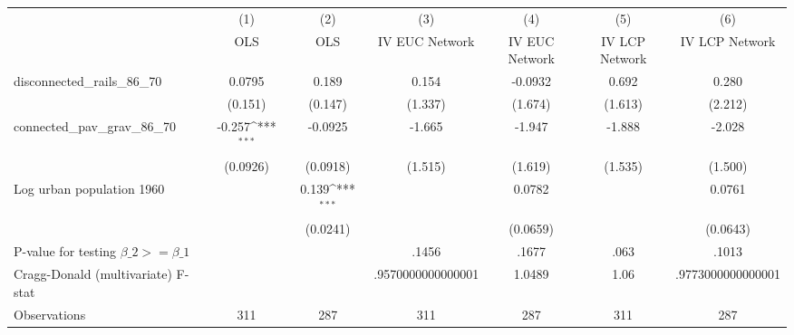 {
\def\sym#1{\ifmmode^{#1}\else\(^{#1}\)\fi}
\begin{tabular}{l*{6}{c}}
\hline\hline
                &\multicolumn{1}{c}{(1)}&\multicolumn{1}{c}{(2)}&\multicolumn{1}{c}{(3)}&\multicolumn{1}{c}{(4)}&\multicolumn{1}{c}{(5)}&\multicolumn{1}{c}{(6)}\\
                &\multicolumn{1}{c}{OLS}&\multicolumn{1}{c}{OLS}&\multicolumn{1}{c}{IV EUC Network}&\multicolumn{1}{c}{IV EUC Network}&\multicolumn{1}{c}{IV LCP Network}&\multicolumn{1}{c}{IV LCP Network}\\
\hline
disconnected\_rails\_86\_70&   0.0795         &    0.189         &    0.154         &  -0.0932         &    0.692         &    0.280         \\
                &  (0.151)         &  (0.147)         &  (1.337)         &  (1.674)         &  (1.613)         &  (2.212)         \\
[1em]
connected\_pav\_grav\_86\_70&   -0.257\sym{***}&  -0.0925         &   -1.665         &   -1.947         &   -1.888         &   -2.028         \\
                & (0.0926)         & (0.0918)         &  (1.515)         &  (1.619)         &  (1.535)         &  (1.500)         \\
[1em]
Log urban population 1960&                  &    0.139\sym{***}&                  &   0.0782         &                  &   0.0761         \\
                &                  & (0.0241)         &                  & (0.0659)         &                  & (0.0643)         \\
\hline
P-value for testing $\beta\_{2} >= \beta\_{1}$&                  &                  &    .1456         &    .1677         &     .063         &    .1013         \\
Cragg-Donald (multivariate) F-stat&                  &                  &.9570000000000001         &   1.0489         &     1.06         &.9773000000000001         \\
Observations    &      311         &      287         &      311         &      287         &      311         &      287         \\
\hline\hline
\end{tabular}
}

